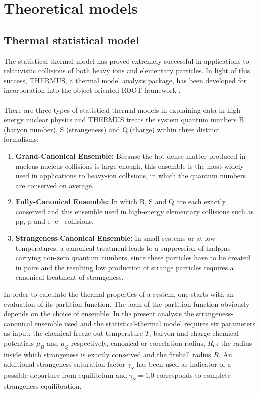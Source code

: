 \section{Theoretical models}\label{sec:model}
\subsection{Thermal statistical model}

The statistical-thermal model has proved extremely successful in applications to relativistic collisions of both heavy ions and elementary particles. In light of this success, THERMUS, a thermal model analysis package, has been developed for incorporation into the object-oriented ROOT framework \cite{Wheaton:2004qb}.\\ \\
There are three types of statistical-thermal models in explaining data in high energy nuclear physics and THERMUS treats the system quantum numbers B (baryon number), S (strangeness) and Q (charge) within three distinct formalisms: 

\begin{enumerate}
\item \textbf{Grand-Canonical Ensemble:} Because the hot dense matter produced in nucleus-nucleus collisions is large enough, this ensemble is the most widely used in applications to heavy-ion collisions, in which the quantum numbers are conserved on average. 
\item \textbf{Fully-Canonical Ensemble:} In which B, S and Q are each exactly conserved and this ensemble used in high-energy elementary collisions such as pp, p\pbar{} and e$^{-}$e$^{+}$ collisions.
\item \textbf{Strangeness-Canonical Ensemble:}  In small systems or at low temperatures, a canonical treatment leads to a suppression of hadrons carrying non-zero quantum numbers, since these particles have to be created in pairs and the resulting low production of strange particles requires a canonical treatment of strangeness.  
 \end{enumerate}
 In order to calculate the thermal properties of a system, one starts with an evaluation of its partition function. The form of the partition function obviously depends on the choice of ensemble. In the present analysis the strangeness-canonical ensemble used and the statistical-thermal model requires six parameters as input: the chemical freeze-out temperature $T$, baryon and charge chemical potentials $\mu_{B}$ and $\mu_{Q}$ respectively, canonical or correlation radius, $R_{C}$; the radius inside which strangeness is exactly conserved and the fireball radius $R$. An additional strangeness saturation factor $\gamma_{S}$ has been used as indicator of a possible departure from equilibrium and $\gamma_{S}=1.0$ corresponds to complete strangeness equilibration.
 

